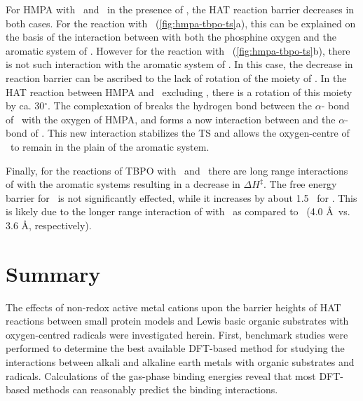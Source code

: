 For HMPA with \cumo\ and \bno\ in the presence of , the HAT reaction barrier decreases in both cases. For the reaction with \cumo\ (\ref{fig:hmpa-tbpo-ts}a), this can be explained on the basis of the interaction between  with both the phosphine oxygen and the aromatic system of \cumo. However for the reaction with \bno\ (\ref{fig:hmpa-tbpo-ts}b), there is not such interaction with the aromatic system of \bno. In this case, the decrease in reaction barrier can be ascribed to the lack of rotation of the  moiety of \bno. In the HAT reaction between HMPA and \bno\ excluding , there is a rotation of this moiety by ca. 30$^\circ$. The complexation of  breaks the hydrogen bond between the $\alpha$- bond of \bno\ with the oxygen of HMPA, and forms a now interaction between  and the $\alpha$- bond of \bno. This new interaction stabilizes the TS and allows the oxygen-centre of \bno\ to remain in the plain of the aromatic system.

Finally, for the reactions of TBPO with \cumo\ and \bno\ there are long range interactions of  with the aromatic systems resulting in a decrease in $\Delta H^\ddagger$. The free energy barrier for \cumo\ is not significantly effected, while it increases by about 1.5 \kcalmol\ for \bno. This is likely due to the longer range interaction of  with \cumo\ as compared to \bno\ (4.0 \AA\ vs. 3.6 \AA, respectively).

\section{Summary}

The effects of non-redox active metal cations upon the barrier heights of HAT reactions between small protein models and Lewis basic organic substrates with oxygen-centred radicals were investigated herein. First, benchmark studies were performed to determine the best available DFT-based method for studying the interactions between alkali and alkaline earth metals with organic substrates and radicals. Calculations of the gas-phase binding energies reveal that most DFT-based methods can reasonably predict the binding interactions.


